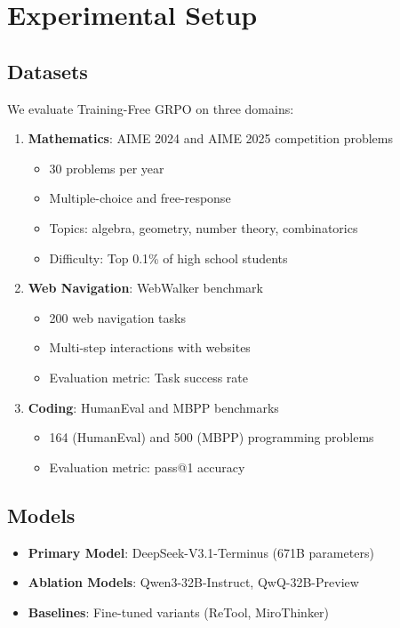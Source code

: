 \section{Experimental Setup}


\subsection{Datasets}

We evaluate Training-Free GRPO on three domains:

\begin{enumerate}
    \item \textbf{Mathematics}: AIME 2024 and AIME 2025 competition problems
    \begin{itemize}
        \item 30 problems per year
        \item Multiple-choice and free-response
        \item Topics: algebra, geometry, number theory, combinatorics
        \item Difficulty: Top 0.1\% of high school students
    \end{itemize}

    \item \textbf{Web Navigation}: WebWalker benchmark
    \begin{itemize}
        \item 200 web navigation tasks
        \item Multi-step interactions with websites
        \item Evaluation metric: Task success rate
    \end{itemize}

    \item \textbf{Coding}: HumanEval and MBPP benchmarks
    \begin{itemize}
        \item 164 (HumanEval) and 500 (MBPP) programming problems
        \item Evaluation metric: pass@1 accuracy
    \end{itemize}
\end{enumerate}

\subsection{Models}

\begin{itemize}
    \item \textbf{Primary Model}: DeepSeek-V3.1-Terminus (671B parameters)
    \item \textbf{Ablation Models}: Qwen3-32B-Instruct, QwQ-32B-Preview
    \item \textbf{Baselines}: Fine-tuned variants (ReTool, MiroThinker)
\end{itemize}

